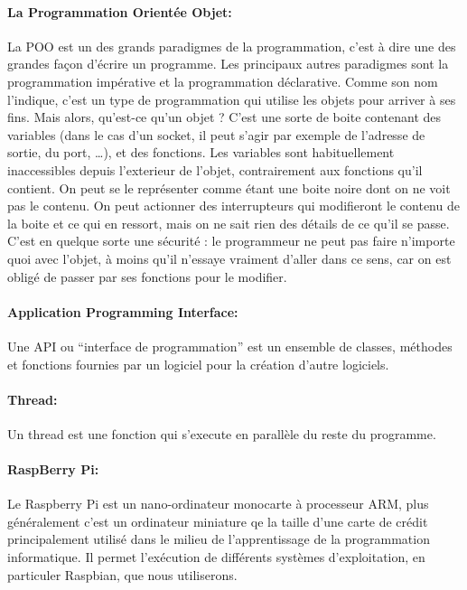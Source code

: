 \documentclass[12pt,a4paper,twoside]{article}
\begin{document}
    \paragraph*{La Programmation Orientée Objet:\\}
    La POO est un des grands paradigmes de la programmation, c'est à dire une des grandes façon d'écrire un programme. Les principaux autres paradigmes sont la programmation impérative et la programmation déclarative. Comme son nom l'indique, c'est un type de programmation qui utilise les objets pour arriver à ses fins. Mais alors, qu'est-ce qu'un objet ? C'est une sorte de boite contenant des variables (dans le cas d'un socket, il peut s'agir par exemple de l'adresse de sortie, du port, …), et des fonctions. Les variables sont habituellement inaccessibles depuis l'exterieur de l'objet, contrairement aux fonctions qu'il contient. On peut se le représenter comme étant une boite noire dont on ne voit pas le contenu. On peut actionner des interrupteurs qui modifieront le contenu de la boite et ce qui en ressort, mais on ne sait rien des détails de ce qu'il se passe. C'est en quelque sorte une sécurité : le programmeur ne peut pas faire n'importe quoi avec l'objet, à moins qu'il n'essaye vraiment d'aller dans ce sens, car on est obligé de passer par ses fonctions pour le modifier.

    \paragraph*{Application Programming Interface:\\}
    Une API ou ``interface de programmation'' est un ensemble de classes, méthodes et fonctions fournies par un logiciel pour la création d'autre logiciels.

    \paragraph*{Thread:\\}
    Un thread est une fonction qui s'execute en parallèle du reste du programme. 

    \paragraph*{RaspBerry Pi:\\}
    Le Raspberry Pi est un nano-ordinateur monocarte à processeur ARM, plus généralement c'est un ordinateur miniature qe la taille d'une carte de crédit principalement utilisé dans le milieu de l'apprentissage de la programmation informatique. Il permet l'exécution de différents systèmes d'exploitation, en particuler Raspbian, que nous utiliserons.
\end{document}

